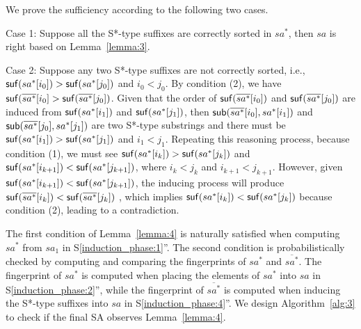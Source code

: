 \documentclass[10pt,journal,compsoc]{IEEEtran}
\begin{document}
\begin{IEEEproof}

    We prove the sufficiency according to the following two cases.

    Case 1: Suppose all the S*-type suffixes are correctly sorted in $sa^*$, then $sa$ is right based on Lemma~\ref{lemma:3}.

    Case 2: Suppose any two S*-type suffixes are not correctly sorted, i.e., ${\sf suf}(sa^*[i_0]) > {\sf suf}(sa^*[j_0])$ and $i_0 < j_0$. By condition (2), we have ${\sf suf}(\overline{sa^*}[i_0] > {\sf suf}(\overline{sa^*}[j_0])$. Given that the order of ${\sf suf}(\overline{sa^*}[i_0])$ and ${\sf suf}(\overline{sa^*}[j_0])$ are induced from ${\sf suf}(sa^*[i_1])$ and ${\sf suf}(sa^*[j_1])$, then ${\sf sub}(\overline{sa^*}[i_0], sa^*[i_1])$ and ${\sf sub}(\overline{sa^*}[j_0], sa^*[j_1])$ are two S*-type substrings and there must be ${\sf suf}(sa^*[i_1])>{\sf suf}(sa^*[j_1])$ and $i_1 < j_1$. Repeating this reasoning process, because condition (1), we must see ${\sf suf}(sa^*[i_k])>{\sf suf}(sa^*[j_k])$ and ${\sf suf}(sa^*[i_{k+1}])<{\sf suf}(sa^*[j_{k+1}])$, where $i_k < j_k$ and $i_{k+1} < j_{k+1}$. However, given ${\sf suf}(sa^*[i_{k+1}])<{\sf suf}(sa^*[j_{k+1}])$, the inducing process will produce ${\sf suf}(\overline{sa^*}[i_k])<{\sf suf}(\overline{sa^*}[j_k])$ , which implies ${\sf suf}(sa^*[i_k])<{\sf suf}(sa^*[j_k])$ because condition (2), leading to a contradiction.
	
\end{IEEEproof}
	

The first condition of Lemma~\ref{lemma:4} is naturally satisfied when computing $sa^*$ from $sa_1$ in S\ref{induction_phase:1}''. The second condition is probabilistically checked by computing and comparing the fingerprints of $sa^*$ and $\overline{sa^*}$. The fingerprint of $sa^*$ is computed when placing the elements of $sa^*$ into $sa$ in S\ref{induction_phase:2}'', while the fingerprint of $\overline{sa^*}$ is computed when inducing the S*-type suffixes into $sa$ in S\ref{induction_phase:4}''. We design Algorithm~\ref{alg:3} to check if the final SA observes Lemma~\ref{lemma:4}. 

\end{document}
